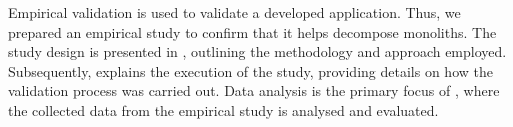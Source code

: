 Empirical validation is used to validate a developed application. Thus, we
prepared an empirical study to confirm that it helps decompose monoliths. The
study design is presented in , outlining the methodology and
approach employed. Subsequently,  explains the execution of
the study, providing details on how the validation process was carried out.
Data analysis is the primary focus of , where the collected
data from the empirical study is analysed and evaluated.

